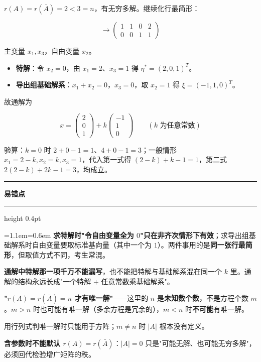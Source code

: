 \documentclass[11pt,openany,UTF8]{ctexbook}
\newcommand{\callouthead}[2]{%
  \par\addvspace{7pt}\noindent
  {\color{#1}\rule[-0.15em]{3pt}{1.05em}}\hspace{0.5em}%
  {\bfseries\color{#1}#2}\par\nobreak\vspace{-0.35em}%
  {\color{rulesep}\hrule height 0.4pt}\nobreak\vspace{0.45em}%
  \begingroup\small\setlength{\parindent}{0pt}%
  \leftskip=1.1em\rightskip=0.6em\noindent\ignorespaces}
\newcommand{\calloutend}{\par\endgroup\addvspace{7pt}}
\newenvironment{callwarn}[1]{\callouthead{warnbar}{#1}}{\calloutend}
\begin{document}
$r(A)=r(\bar A)=2<3=n$，有无穷多解。继续化行最简形：

\[\longrightarrow\begin{pmatrix} 1 & 1 & 0 & 2 \\ 0 & 0 & 1 & 1 \end{pmatrix}\]

主变量 $x_1,x_3$，自由变量 $x_2$。

\begin{itemize}
\item \textbf{特解}：令 $x_2=0$，由 $x_1=2$、$x_3=1$ 得 $\eta^*=(2,0,1)^T$。
\item \textbf{导出组基础解系}：$x_1+x_2=0$，$x_3=0$，取 $x_2=1$ 得 $\xi=(-1,1,0)^T$。
\end{itemize}
故通解为

\[x=\begin{pmatrix} 2 \\ 0 \\ 1 \end{pmatrix}+k\begin{pmatrix} -1 \\ 1 \\ 0 \end{pmatrix}\qquad(k\text{ 为任意常数})\]

验算：$k=0$ 时 $2+0-1=1$、$4+0-1=3$；一般情形 $x_1=2-k,x_2=k,x_3=1$，代入第一式得 $(2-k)+k-1=1$，第二式 $2(2-k)+2k-1=3$，均成立。

\begin{callwarn}{易错点}
\textbf{求特解时"令自由变量全为 $0$"只在非齐次情形下有效}；求导出组基础解系时自由变量要取标准基向量（其中一个为 $1$）。两件事用的是\textbf{同一张行最简形}，但取值方式不同，考生常混。

\textbf{通解中特解那一项千万不能漏写}，也不能把特解与基础解系混在同一个 $k$ 里。通解的结构永远长成"一个特解 $+$ 任意常数乘基础解系"。

\textbf{"$r(A)=r(\bar A)=n$ 才有唯一解"}——这里的 $n$ 是\textbf{未知数个数}，不是方程个数 $m$。$m>n$ 时也可能有唯一解（多余方程是冗余的），$m<n$ 时\textbf{不可能}有唯一解。

用行列式判唯一解时只能用于方阵；$m\ne n$ 时 $\vert A\vert$ 根本没有定义。

\textbf{含参数时不能默认 $r(A)=r(\bar A)$}：$\vert A\vert=0$ 只是"可能无解、也可能无穷多解"，必须回代检验增广矩阵的秩。

\end{callwarn}
\end{document}
